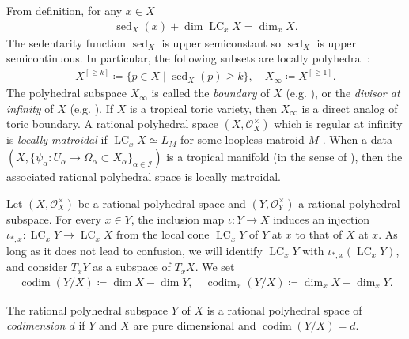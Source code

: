 \documentclass[a4paper,dvipdfmx,reqno,12pt]{amsart}
\theoremstyle{definition}
\newcommand{\deq}{\coloneqq}
\newcommand{\opn}[1]{\operatorname{#1}}
\numberwithin{equation}{section}
\begin{document}
From definition, for any $x\in X$
\begin{align}
\opn{sed}_X(x)+\dim \opn{LC}_x X=\dim_x X.
\end{align}
The sedentarity function
$\opn{sed}_X$ is upper semiconstant
\cite[Definition 7.1.11]{mikhalkin2018tropical} so 
$\opn{sed}_X$ is upper semicontinuous.
In particular, the following subsets are
locally polyhedral
\cite[Proposition 7.1.12]{mikhalkin2018tropical}: 
\begin{align}
X^{[\geq k]}\deq \{p\in X\mid \opn{sed}_X(p)\geq k\},
\quad 
X_{\infty}\deq X^{[\geq 1]}.
\end{align}
The polyhedral subspace $X_{\infty}$ is called
the \emph{boundary} of $X$ (e.g. \cite{demedrano2023chern}),
or the \emph{divisor at infinity} of $X$
(e.g. \cite[Definition 7.2.9]{mikhalkin2018tropical}).
If $X$ is a
tropical toric variety, then $X_{\infty}$ is a
direct analog of toric boundary.
A rational polyhedral space $(X,\mathcal{O}_X^{\times})$
which is regular at infinity is \emph{locally matroidal}
if $\opn{LC}_x X\simeq L_M$ for some loopless matroid $M$
\cite[]{MR4637248}. When a data
$(X,\{\psi_\alpha \colon U_{\alpha} \to 
\Omega_{\alpha}\subset X_{\alpha}\}_{\alpha \in \mathcal{I}})$
is a tropical manifold (in the sense of 
\cite[Definition 2.3]{demedrano2023chern}),
then the associated rational polyhedral space
is locally matroidal.

Let $(X,\mathcal{O}_X^{\times})$ be a rational
polyhedral space and $(Y,\mathcal{O}_Y^{\times})$
a rational polyhedral subspace.
For every $x\in Y$, 
the inclusion map $\iota\colon Y\to X$ induces
an injection 
$\iota_{*,x}\colon \opn{LC}_x Y\to \opn{LC}_x X$
from the local cone $\opn{LC}_x Y$ of $Y$ at $x$ to 
that of $X$ at $x$.
As long as it does not lead to confusion, we will identify
$\opn{LC}_x Y$ with $\iota_{*,x}(\opn{LC}_x Y)$, and
consider $T_x Y$ as a subspace of $T_{x}X$.
We set 
\begin{align}
\opn{codim}(Y/X)\deq \dim X -\dim Y,\quad 
\opn{codim}_x(Y/X)\deq \dim_x X -\dim_x Y.
\end{align}

The rational polyhedral subspace $Y$ of $X$ is
a rational polyhedral space of
\emph{codimension $d$} if $Y$ and $X$ are pure dimensional
and $\opn{codim}(Y/X)=d$.
\end{document}

